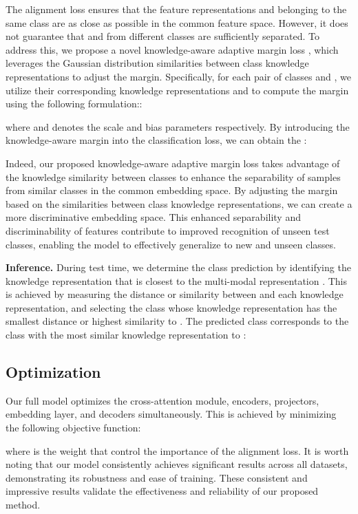 \documentclass[10pt,twocolumn,letterpaper]{article}
\begin{document}
The alignment loss  ensures that the feature representations  and  belonging to the same class are as close as possible in the common feature space. However, it does not guarantee that  and  from different classes are sufficiently separated. To address this, we propose a novel knowledge-aware adaptive margin loss , which leverages the Gaussian distribution similarities between class knowledge representations to adjust the margin. Specifically, for each pair of classes  and , we utilize their corresponding knowledge representations  and  to compute the margin  using the following formulation::

where  and  denotes the scale and bias parameters respectively. By introducing the knowledge-aware margin into the classification loss, we can obtain the :

Indeed, our proposed knowledge-aware adaptive margin loss takes advantage of the knowledge similarity between classes to enhance the separability of samples from similar classes in the common embedding space. By adjusting the margin based on the similarities between class knowledge representations, we can create a more discriminative embedding space. This enhanced separability and discriminability of features contribute to improved recognition of unseen test classes, enabling the model to effectively generalize to new and unseen classes.



\noindent
\textbf{Inference.} 
During test time, we determine the class prediction  by identifying the knowledge representation that is closest to the multi-modal representation . This is achieved by measuring the distance or similarity between  and each knowledge representation, and selecting the class whose knowledge representation has the smallest distance or highest similarity to . The predicted class  corresponds to the class with the most similar knowledge representation to :


\subsection{Optimization}
Our full model optimizes the cross-attention module, encoders, projectors, embedding layer, and decoders simultaneously. This is achieved by minimizing the following objective function:

where  is the weight that control the importance of the alignment loss. It is worth noting that our model consistently achieves significant results across all datasets, demonstrating its robustness and ease of training. These consistent and impressive results validate the effectiveness and reliability of our proposed method.
\end{document}
